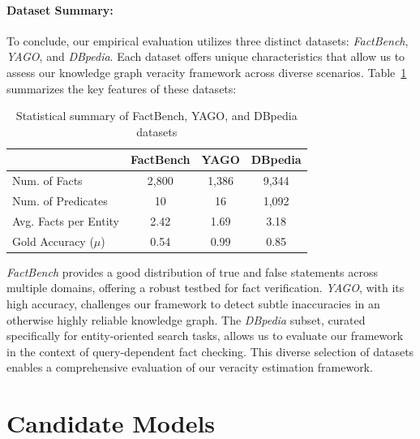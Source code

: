 \paragraph{Dataset Summary:}\label{par:summary}
To conclude, our empirical evaluation utilizes three distinct datasets: \textit{FactBench}, \textit{YAGO}, and \textit{DBpedia}.
Each dataset offers unique characteristics that allow us to assess our knowledge graph veracity framework across diverse scenarios.
Table~\ref{tab:dataset-summary} summarizes the key features of these datasets:

\begin{table}[h!]
    \centering
    \caption{Statistical summary of FactBench, YAGO, and DBpedia datasets}
    \begin{tabular}{lccc}
        \toprule
        & \textbf{FactBench} & \textbf{YAGO} & \textbf{DBpedia} \\
        \midrule
        Num. of Facts & 2,800 & 1,386 & 9,344 \\
        Num. of Predicates & 10 & 16 & 1,092 \\
        Avg. Facts per Entity & 2.42 & 1.69 & 3.18 \\
        Gold Accuracy ($\mu$) & 0.54 & 0.99 & 0.85 \\
        \bottomrule
    \end{tabular}
    \label{tab:dataset-summary}
\end{table}

\textit{FactBench} provides a good distribution of true and false statements across multiple domains, offering a robust testbed for fact verification.
\textit{YAGO}, with its high accuracy, challenges our framework to detect subtle inaccuracies in an otherwise highly reliable knowledge graph.
The \textit{DBpedia} subset, curated specifically for entity-oriented search tasks, allows us to evaluate our framework in the context of query-dependent fact checking.
This diverse selection of datasets enables a comprehensive evaluation of our veracity estimation framework.

\section{Candidate Models}\label{sec:empirical-evaluation:candidate-models}
